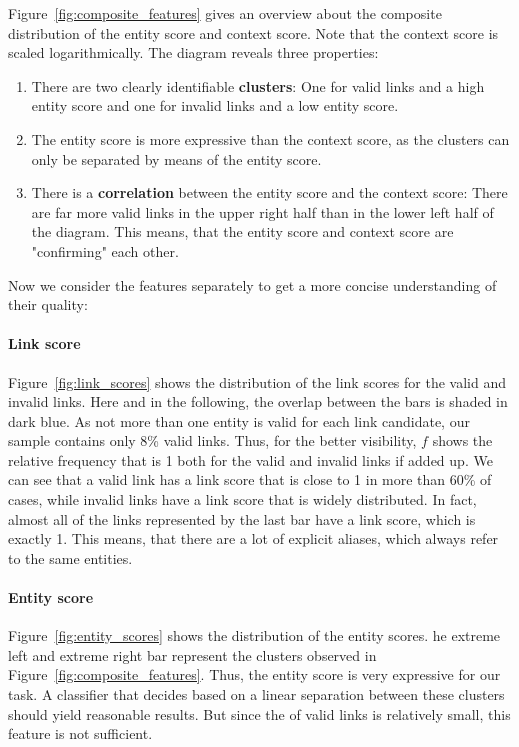 Figure~\ref{fig:composite_features} gives an overview about the composite distribution of the entity score and context score. Note that the context score is scaled logarithmically. The diagram reveals three properties:

\begin{enumerate}
\item There are two clearly identifiable \textbf{clusters}: One for valid links and a high entity score and one for invalid links and a low entity score. 

\item The entity score is more expressive than the context score, as the clusters can only be separated by means of the entity score.

\item There is a \textbf{correlation} between the entity score and the context score: There are far more valid links in the upper right half than in the lower left half of the diagram. This means, that the entity score and context score are "confirming" each other.
\end{enumerate}

Now we consider the features separately to get a more concise understanding of their quality:

\paragraph{Link score}
Figure~\ref{fig:link_scores} shows the distribution of the link scores for the valid and invalid links. Here and in the following, the overlap between the bars is shaded in dark blue. As not more than one entity is valid for each link candidate, our sample contains only 8\% valid links. Thus, for the better visibility, $f$ shows the relative frequency that is 1 both for the valid and invalid links if added up. We can see that a valid link has a link score that is close to 1 in more than 60\% of cases, while invalid links have a link score that is widely distributed. In fact, almost all of the links represented by the last bar have a link score, which is exactly 1. This means, that there are a lot of explicit aliases, which always refer to the same entities. 

\paragraph{Entity score}
Figure~\ref{fig:entity_scores} shows the distribution of the entity scores. he extreme left and extreme right bar represent the clusters observed in Figure~\ref{fig:composite_features}. Thus, the entity score is very expressive for our task. A classifier that decides based on a linear separation between these clusters should yield reasonable results. But since the of valid links is relatively small, this feature is not sufficient.

